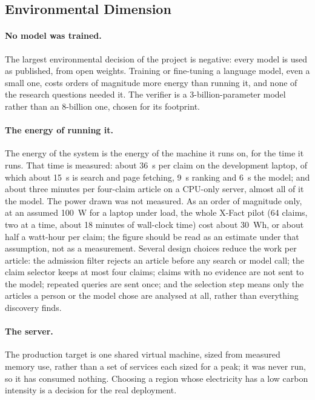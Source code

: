 
\subsection{Environmental Dimension}

\paragraph{No model was trained.} The largest environmental decision of
the project is negative: every model is used as published, from open
weights. Training or fine-tuning a language model, even a small one,
costs orders of magnitude more energy than running it, and none of the
research questions needed it. The verifier is a 3-billion-parameter
model rather than an 8-billion one, chosen for its footprint.

\paragraph{The energy of running it.} The energy of the system is the
energy of the machine it runs on, for the time it runs. That time is
measured: about 36~s per claim on the development laptop, of which
about 15~s is search and page fetching, 9~s ranking and 6~s the model;
and about three minutes per four-claim article on a CPU-only server,
almost all of it the model. The power drawn was not
measured. As an order of magnitude only, at an assumed 100~W for a
laptop under load, the whole X-Fact pilot (64 claims, two at a time,
about 18 minutes of wall-clock time) cost about 30~Wh, or about half a
watt-hour per claim; the figure should be read as an estimate under
that assumption, not as a measurement. Several design choices reduce the work per article: the
admission filter rejects an article before any search or model call;
the claim selector keeps at most four claims; claims with no evidence
are not sent to the model; repeated queries are sent once; and the
selection step means only the articles a person or the model chose are
analysed at all, rather than everything discovery finds.

\paragraph{The server.} The production target is one shared virtual
machine, sized from measured memory use, rather than a set of services
each sized for a peak; it was never run, so it has consumed nothing.
Choosing a region whose electricity has a low carbon intensity is a
decision for the real deployment.
